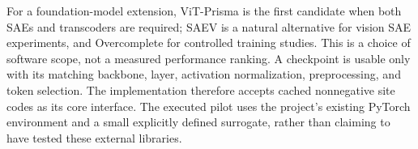 For a foundation-model extension, ViT-Prisma is the first candidate when
both SAEs and transcoders are required; SAEV is a natural alternative for
vision SAE experiments, and Overcomplete for controlled training studies.
This is a choice of software scope, not a measured performance ranking.
A checkpoint is usable only with its matching backbone, layer, activation
normalization, preprocessing, and token selection. The implementation
therefore accepts cached nonnegative site codes as its core interface.
The executed pilot uses the project's existing PyTorch environment and a
small explicitly defined surrogate, rather than claiming to have tested
these external libraries.
